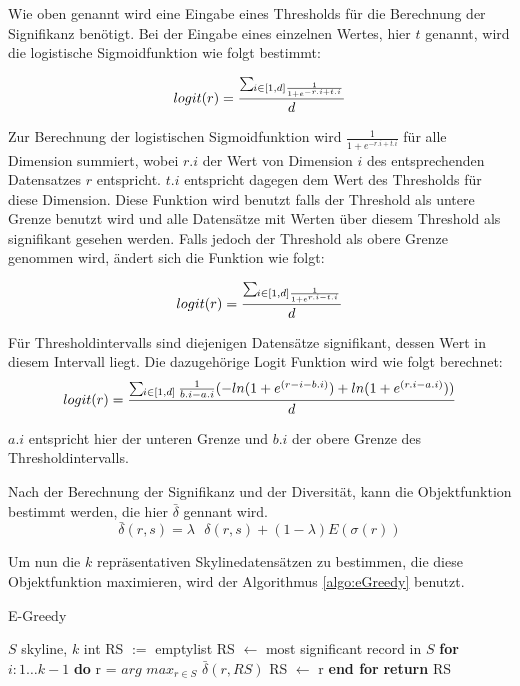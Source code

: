 Wie oben genannt wird eine Eingabe eines Thresholds für die Berechnung der Signifikanz benötigt. Bei der Eingabe eines einzelnen Wertes, hier $t$ genannt, wird die logistische Sigmoidfunktion wie folgt bestimmt:

$$logit(r)=\frac{\sum\mathop{}_{\mkern-5mu i \in{[1,d]}\frac{1}{1+e^{-r.i+t.i}}}}{d}$$

Zur Berechnung der logistischen Sigmoidfunktion  wird $\frac{1}{1+e^{-r.i+t.i}}$ für alle Dimension summiert, wobei $r.i$ der Wert von Dimension $i$ des entsprechenden Datensatzes $r$ entspricht. $t.i$ entspricht dagegen dem Wert des Thresholds für diese Dimension. Diese Funktion wird benutzt falls der Threshold als untere Grenze benutzt wird und alle Datensätze mit Werten über diesem Threshold als signifikant gesehen werden.
Falls jedoch der Threshold als obere Grenze genommen wird, ändert sich die Funktion wie folgt:

$$logit(r)=\frac{\sum\mathop{}_{\mkern-5mu i \in{[1,d]}\frac{1}{1+e^{r.i-t.i}}}}{d}$$

Für Thresholdintervalls sind diejenigen Datensätze signifikant, dessen Wert in diesem Intervall liegt. Die dazugehörige Logit Funktion wird wie folgt berechnet:
$$logit(r)=\frac{\sum\limits\mathop{}_{\mkern-5mu i \in{[1,d]}}\frac{1}{b.i-a.i}(-ln(1+e^{(r-i-b.i)})+ln(1+e^{(r.i-a.i)}))}{d}$$

$a.i$ entspricht hier der unteren Grenze und $b.i$ der obere Grenze des Thresholdintervalls. 


Nach der Berechnung der Signifikanz und der Diversität, kann die Objektfunktion bestimmt werden, die hier $\bar{\delta}$ gennant wird.
$$\bar{\delta}(r,s)= \lambda \text{ } \delta(r,s)+(1- \lambda)E(\sigma(r))$$

Um nun die $k$ repräsentativen Skylinedatensätzen zu bestimmen, die diese Objektfunktion maximieren, wird der Algorithmus \ref{algo:eGreedy} benutzt. 


\begin{algorithm}[H]
\caption{E-Greedy}\label{algo:eGreedy}
\begin{algorithmic}[1]
\INPUTBF $S$ skyline, $k$ int
\State RS $:=$ emptylist
\State RS $\leftarrow$ most significant record in $S$
\State \textbf{for} $i: 1\ldots k-1$ \textbf{do}
\State \hspace{\algorithmicindent}r = $arg$ $max_{r\in{S}}$ $\bar{\delta}(r,RS)$
\State \hspace{\algorithmicindent} RS $\leftarrow$ r
\State \textbf{end for}
\State \textbf{return} RS
\end{algorithmic}
\end{algorithm}

